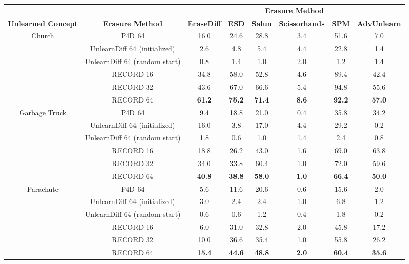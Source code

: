 \begin{tabular}{c|c|c|c|c|c|c|c}
    \toprule
        && \multicolumn{6}{c}{\textbf{Erasure Method}} \\
        \cmidrule(lr){3-8} 
        \textbf{Unlearned Concept} & \textbf{Erasure Method} & \textbf{EraseDiff} & \textbf{ESD} & \textbf{Salun} & \textbf{Scissorhands} & \textbf{SPM} & \textbf{AdvUnlearn} \\
    \midrule
        \multirow{4}{*}{Church} 
        & P4D 64  & 16.0 & 24.6 & 28.8 & 3.4 & 51.6 & 7.0 \\
        & UnlearnDiff 64 (initialized) & 2.6 & 4.8 & 5.4 & 4.4 & 22.8 & 1.4 \\
        & UnlearnDiff 64 (random start) & 0.8 & 1.4 & 1.0 & 2.0 & 1.2 & 1.4 \\
        & RECORD 16 & 34.8 & 58.0 & 52.8 & 4.6 & 89.4 & 42.4 \\
        & RECORD 32 & 43.6 & 67.0 & 66.6 & 5.4 & 94.8 & 55.6 \\
        & RECORD 64 & \textbf{61.2} & \textbf{75.2} & \textbf{71.4} & \textbf{8.6} & \textbf{92.2} & \textbf{57.0} \\
    \midrule
        \multirow{4}{*}{Garbage Truck} 
        & P4D 64  & 9.4  & 18.8 & 21.0 & 0.4 & 35.8 & 34.2 \\
        & UnlearnDiff 64 (initialized) & 16.0 & 3.8 & 17.0 & 4.4 & 29.2 & 0.2 \\
        & UnlearnDiff 64 (random start) & 1.8 & 0.6 & 1.0 & 1.4 & 2.4 & 0.8 \\
        & RECORD 16 & 18.8 & 26.2 & 43.0 & 1.6 & 69.0 & 63.8 \\
        & RECORD 32 & 34.0 & 33.8 & 60.4 & 1.0 & 72.0 & 59.6 \\
        & RECORD 64 & \textbf{40.8} & \textbf{38.8} & \textbf{58.0} & \textbf{1.0} & \textbf{66.4} & \textbf{50.0} \\
    \midrule
        \multirow{4}{*}{Parachute} 
        & P4D 64  & 5.6  & 11.6 & 20.6 & 0.6 & 15.6 & 2.0 \\
        & UnlearnDiff 64 (initialized) & 3.0 & 2.4 & 2.4 & 1.0 & 6.8 & 1.2 \\
        & UnlearnDiff 64 (random start) & 0.6 & 0.6 & 1.2 & 0.4 & 1.8 & 0.2 \\
        & RECORD 16 & 6.0  & 31.0 & 32.8 & 2.0 & 45.8 & 17.2 \\
        & RECORD 32 & 10.0 & 36.6 & 35.4 & 1.0 & 55.8 & 26.2 \\
        & RECORD 64 & \textbf{15.4} & \textbf{44.6} & \textbf{48.8} & \textbf{2.0} & \textbf{60.4} & \textbf{35.6} \\

\end{tabular}
